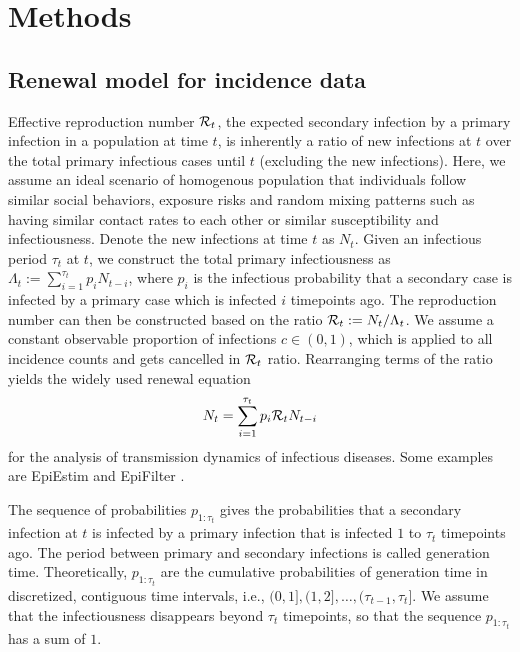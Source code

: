 \section{Methods}

\subsection{Renewal model for incidence data} 

Effective reproduction number $\mathcal{R}_t$, the expected secondary infection by a primary infection in a population at time $t$, is inherently a ratio of new infections at $t$ over the total primary infectious cases until $t$ (excluding the new infections). Here, we assume an ideal scenario of homogenous population that individuals follow similar social behaviors, exposure risks and random mixing patterns such as having similar contact rates to each other or similar susceptibility and infectiousness. 
Denote the new infections at time $t$ as $N_t$. Given an infectious period $\tau_t$ at $t$, we construct the total primary infectiousness as $\Lambda_t := \sum_{i=1}^{\tau_t} p_i N_{t-i}$, where $p_i$ is the infectious probability that a secondary case is infected by a primary case which is infected $i$ timepoints ago. The reproduction number can then be constructed based on the ratio $\mathcal{R}_t := N_t / \Lambda_t$. We assume a constant observable proportion of infections $c\in (0,1)$, which is applied to all incidence counts and gets cancelled in $\mathcal{R}_t$ ratio. 
Rearranging terms of the ratio yields the widely used renewal equation 
\begin{equation} \label{eq:renew-equation}
  N_t = \sum_{i=1}^{\tau_t} p_i\mathcal{R}_t N_{t-i}
\end{equation}
for the analysis of transmission dynamics of infectious diseases. Some examples are EpiEstim \citep{cori2013new} and EpiFilter \citep{parag2021improved}. 

The sequence of probabilities $p_{1:\tau_t}$ gives the probabilities that a secondary infection at $t$ is infected by a primary infection that is infected $1$ to $\tau_t$ timepoints ago. The period between primary and secondary infections is called generation time. Theoretically, $p_{1:\tau_t}$ are the cumulative probabilities of generation time in discretized, contiguous time intervals, i.e., $(0,1], (1,2], \dots, (\tau_{t-1}, \tau_t]$. We assume that the infectiousness disappears beyond $\tau_t$ timepoints, so that the sequence $p_{1:\tau_t}$ has a sum of $1$. 

